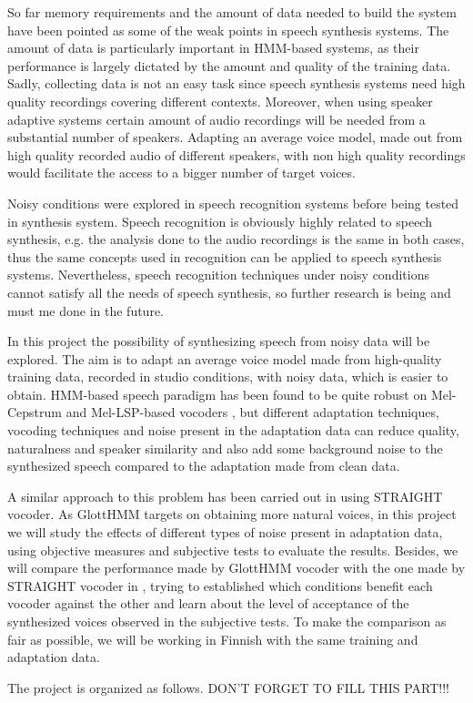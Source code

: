 So far memory requirements and the amount of data needed to build the system have been pointed as some of the weak points in speech synthesis systems. The amount of data is particularly important in HMM-based systems, as their performance is largely dictated by the amount and quality of the training data. Sadly, collecting data is not an easy task since speech synthesis systems need high quality recordings covering different contexts. Moreover, when using speaker adaptive systems certain amount of audio recordings will be needed from a substantial number of speakers. Adapting an average voice model, made out from high quality recorded audio of different speakers, with non high quality recordings would facilitate the access to a bigger number of target voices.

Noisy conditions were explored in speech recognition systems before being tested in synthesis system. Speech recognition is obviously highly related to speech synthesis, e.g. the analysis done to the audio recordings is the same in both cases, thus the same concepts used in recognition can be applied to speech synthesis systems. Nevertheless, speech recognition techniques under noisy conditions cannot satisfy all the needs of speech synthesis, so further research is being and must me done in the future.

In this project the possibility of synthesizing speech from noisy data will be explored. The aim is to adapt an average voice model made from high-quality training data, recorded in studio conditions, with noisy data, which is easier to obtain. HMM-based speech paradigm has been found to be quite robust on Mel-Cepstrum \cite{karhila_remes_icassp13, yamagishi2008robustness} and Mel-LSP-based vocoders \cite{Yanagisawa_SSW8}, but different adaptation techniques, vocoding techniques and noise present in the adaptation data can reduce quality, naturalness and speaker similarity and also add some background noise to the synthesized speech compared to the adaptation made from clean data. 

A similar approach to this problem has been carried out in \cite{karhila_remes_icassp13} using STRAIGHT vocoder. As GlottHMM targets on obtaining more natural voices, in this project we will study the effects of different types of noise present in adaptation data, using objective measures and subjective tests to evaluate the results. Besides, we will compare the performance made by GlottHMM vocoder with the one made by STRAIGHT vocoder in \cite{karhila_remes_icassp13}, trying to established which conditions benefit each vocoder against the other and learn about the level of acceptance of the synthesized voices observed in the subjective tests. To make the comparison as fair as possible, we will be working in Finnish with the same training and adaptation data.

The project is organized as follows. DON'T FORGET TO FILL THIS PART!!!